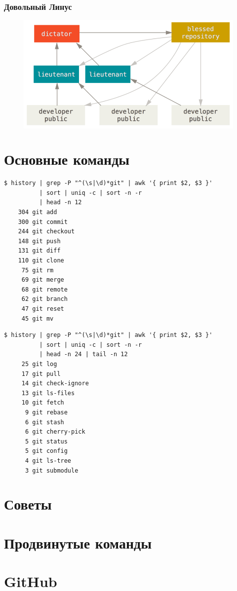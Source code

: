 \documentclass[pdf,russian]{beamer}
\begin{document}
\begin{frame}
    \frametitle{Довольный Линус}
    \begin{figure}
        \includegraphics[width=\textwidth]{dictator}
    \end{figure}
\end{frame}

\section{Основные команды}

\begin{frame}[fragile]
    \begin{verbatim}
$ history | grep -P "^(\s|\d)*git" | awk '{ print $2, $3 }'
          | sort | uniq -c | sort -n -r
          | head -n 12
    304 git add
    300 git commit
    244 git checkout
    148 git push
    131 git diff
    110 git clone
     75 git rm
     69 git merge
     68 git remote
     62 git branch
     47 git reset
     45 git mv
    \end{verbatim}
\end{frame}

\begin{frame}[fragile]
    \begin{verbatim}
$ history | grep -P "^(\s|\d)*git" | awk '{ print $2, $3 }'
          | sort | uniq -c | sort -n -r
          | head -n 24 | tail -n 12
     25 git log
     17 git pull
     14 git check-ignore
     13 git ls-files
     10 git fetch
      9 git rebase
      6 git stash
      6 git cherry-pick
      5 git status
      5 git config
      4 git ls-tree
      3 git submodule
    \end{verbatim}
\end{frame}

\section{Советы}

\section{Продвинутые команды}

\section{GitHub}
\end{document}
